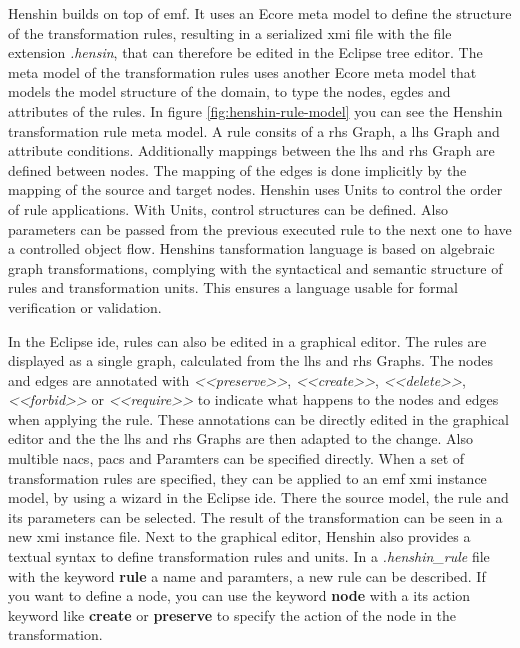   Henshin builds on top of \ac{emf}. It uses an Ecore meta model to define the structure of the transformation rules, resulting in a serialized \ac{xmi} file with the file extension \textit{.hensin}, that can therefore be edited in the Eclipse tree editor. \cite{henshin-repo} The meta model of the transformation rules uses another Ecore meta model that models the model structure of the domain, to type the nodes, egdes and attributes of the rules. \cite{henshin} In figure \ref{fig:henshin-rule-model} you can see the Henshin transformation rule meta model. A rule consits of a \ac{rhs} Graph, a \ac{lhs} Graph and attribute conditions. Additionally mappings between the \ac{lhs} and \ac{rhs} Graph are defined between nodes. The mapping of the edges is done implicitly by the mapping of the source and target nodes. \cite{henshin} Henshin uses Units to control the order of rule applications. With Units, control structures can be defined. Also parameters can be passed from the previous executed rule to the next one to have a controlled object flow. Henshins tansformation language is based on algebraic graph transformations, complying with the syntactical and semantic structure of rules and transformation units. This ensures a language usable for formal verification or validation. \cite{henshin}

  In the Eclipse \ac{ide}, rules can also be edited in a graphical editor. The rules are displayed as a single graph, calculated from the \ac{lhs} and \ac{rhs} Graphs. The nodes and edges are annotated with \textit{\textless{}\textless{}preserve\textgreater\textgreater}, \textit{\textless{}\textless{}create\textgreater\textgreater}, \textit{\textless{}\textless{}delete\textgreater\textgreater}, \textit{\textless{}\textless{}forbid\textgreater\textgreater} or \textit{\textless{}\textless{}require\textgreater\textgreater} to indicate what happens to the nodes and edges when applying the rule. These annotations can be directly edited in the graphical editor and the the \ac{lhs} and \ac{rhs} Graphs are then adapted to the change. Also multible \acp{nac}, \acp{pac} and Paramters can be specified directly. \cite{henshin-repo} When a set of transformation rules are specified, they can be applied to an \ac{emf} \ac{xmi} instance model, by using a wizard in the Eclipse \ac{ide}. There the source model, the rule and its parameters can be selected. The result of the transformation can be seen in a new \ac{xmi} instance file. \cite{henshin-repo} Next to the graphical editor, Henshin also provides a textual syntax to define transformation rules and units. In a \textit{.henshin\_rule} file with the keyword \textbf{rule} a name and paramters, a new rule can be described. If you want to define a node, you can use the keyword \textbf{node} with a its action keyword like \textbf{create} or \textbf{preserve} to specify the action of the node in the transformation. 

